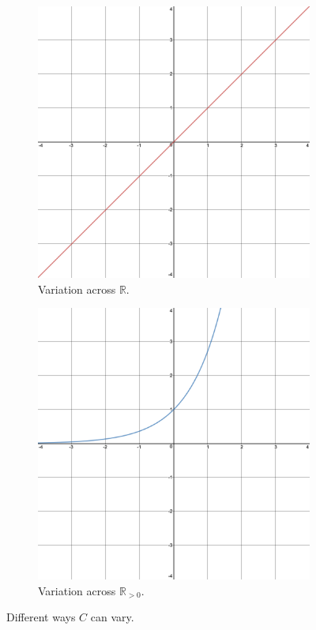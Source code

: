 \documentclass{article}
\begin{document}
\begin{figure}[h!]
    \centering
    \begin{subfigure}[b]{0.4\linewidth}
        \includegraphics[width=\linewidth]{Blender/C-straight.png}
        \caption{Variation across $\mathbb{R}$.}
        \label{fig:3a}
    \end{subfigure}\hspace{3em}
    \begin{subfigure}[b]{0.4\linewidth}
        \includegraphics[width=\linewidth]{Blender/C-e^x.png}
        \caption{Variation across $\mathbb{R}_{>0}$.}
        \label{fig:3b}
    \end{subfigure}
    \caption{Different ways $C$ can vary.}
    \label{fig:3}
\end{figure}
\end{document}
